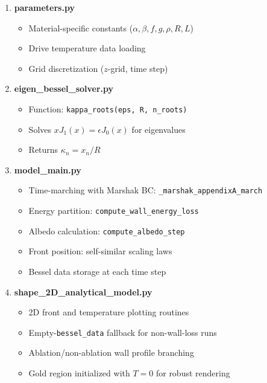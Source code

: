 \documentclass[12pt,a4paper]{article}
\begin{document}
\begin{enumerate}
    \item \textbf{parameters.py}
    \begin{itemize}
        \item Material-specific constants ($\alpha, \beta, f, g, \rho, R, L$)
        \item Drive temperature data loading
        \item Grid discretization ($z$-grid, time step)
    \end{itemize}
    
    \item \textbf{eigen\_bessel\_solver.py}
    \begin{itemize}
        \item Function: \texttt{kappa\_roots(eps, R, n\_roots)}
        \item Solves $x J_1(x) = \epsilon J_0(x)$ for eigenvalues
        \item Returns $\kappa_n = x_n / R$
    \end{itemize}
    
    \item \textbf{model\_main.py}
    \begin{itemize}
        \item Time-marching with Marshak BC: \texttt{\_marshak\_appendixA\_march}
        \item Energy partition: \texttt{compute\_wall\_energy\_loss}
        \item Albedo calculation: \texttt{compute\_albedo\_step}
        \item Front position: self-similar scaling laws
        \item Bessel data storage at each time step
    \end{itemize}

    \item \textbf{shape\_2D\_analytical\_model.py}
    \begin{itemize}
        \item 2D front and temperature plotting routines
        \item Empty-\texttt{bessel\_data} fallback for non-wall-loss runs
        \item Ablation/non-ablation wall profile branching
        \item Gold region initialized with $T=0$ for robust rendering
    \end{itemize}
    

\end{enumerate}
\end{document}
